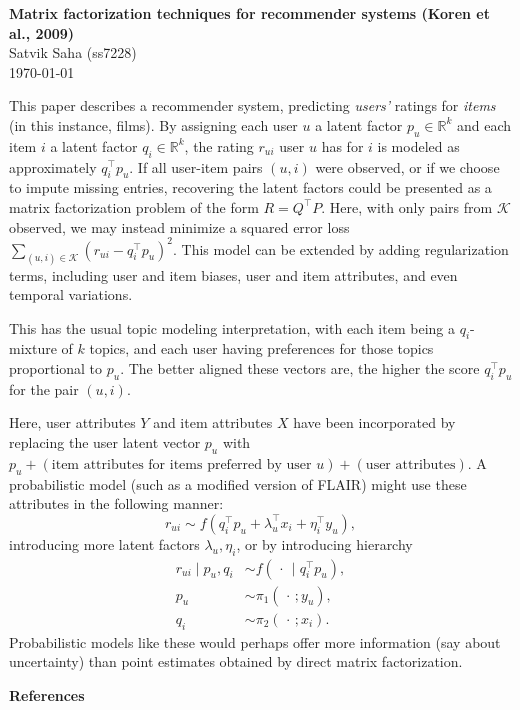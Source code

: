 \documentclass[12pt]{article}
\begin{document}
\begin{flushleft}
\textbf{Matrix factorization techniques for recommender systems (Koren et al., 2009)} \\
Satvik Saha (ss7228) \\
\today
\end{flushleft}

\vspace{0.1in}


This paper describes a recommender system, predicting \emph{users'} ratings for
\emph{items} (in this instance, films).
By assigning each user $u$ a latent factor $p_u \in \mathbb{R}^k$ and each item
$i$ a latent factor $q_i \in \mathbb{R}^k$, the rating $r_{ui}$ user $u$ has
for $i$ is modeled as approximately $q_i^\top p_u$.
If all user-item pairs $(u, i)$ were observed, or if we choose to impute
missing entries, recovering the latent factors could be presented as a matrix
factorization problem of the form $R = Q^\top P$.
Here, with only pairs from $\mathcal{K}$ observed, we may instead minimize a
squared error loss $\sum_{(u, i) \in \mathcal{K}} (r_{ui} - q_i^\top p_u)^2$.
This model can be extended by adding regularization terms, including user and
item biases, user and item attributes, and even temporal variations.

This has the usual topic modeling interpretation, with each item being a
$q_i$-mixture of $k$ topics, and each user having preferences for those topics
proportional to $p_u$.
The better aligned these vectors are, the higher the score $q_i^\top p_u$ for
the pair $(u, i)$.

Here, user attributes $Y$ and item attributes $X$ have been incorporated by
replacing the user latent vector $p_u$ with $p_u + (\text{item attributes for
items preferred by user $u$}) + (\text{user attributes})$.
A probabilistic model (such as a modified version of FLAIR) might use these
attributes in the following manner: \[
    r_{ui} \sim f(q_i^\top p_u + \lambda_u^\top x_i + \eta_i^\top y_u),
\] introducing more latent factors $\lambda_u, \eta_i$, or by introducing
hierarchy \begin{align*}
    r_{ui} \mid p_u, q_i &\sim f(\,\cdot\,\mid q_i^\top p_u), \\
    p_u &\sim \pi_1(\,\cdot\,; y_u), \\
    q_i &\sim \pi_2(\,\cdot\,; x_i).
\end{align*}
Probabilistic models like these would perhaps offer more information (say about
uncertainty) than point estimates obtained by direct matrix factorization.


\nocite{*}


\vfill

\begingroup
\renewcommand{\section}[2]{}%
\textbf{References}

\endgroup
\end{document}
